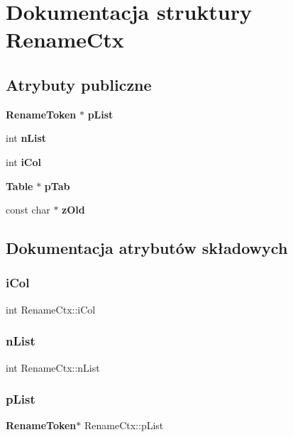 \section{Dokumentacja struktury Rename\+Ctx}
\label{struct_rename_ctx}
\subsection*{Atrybuty publiczne}
\begin{DoxyCompactItemize}
\item 
\textbf{ Rename\+Token} $\ast$ \textbf{ p\+List}
\item 
int \textbf{ n\+List}
\item 
int \textbf{ i\+Col}
\item 
\textbf{ Table} $\ast$ \textbf{ p\+Tab}
\item 
const char $\ast$ \textbf{ z\+Old}
\end{DoxyCompactItemize}


\subsection{Dokumentacja atrybutów składowych}
\mbox{\label{struct_rename_ctx_ad9a482d9cdc3ba175a9659eebcc20ee2}} 
\subsubsection{iCol}
{\footnotesize\ttfamily int Rename\+Ctx\+::i\+Col}

\mbox{\label{struct_rename_ctx_a1c164be49c03e4b5b4fb9fce482ad24b}} 
\subsubsection{nList}
{\footnotesize\ttfamily int Rename\+Ctx\+::n\+List}

\mbox{\label{struct_rename_ctx_a80b3613bb4c513ca112aaa8a50f13ab7}} 
\subsubsection{pList}
{\footnotesize\ttfamily \textbf{ Rename\+Token}$\ast$ Rename\+Ctx\+::p\+List}

\mbox{\label{struct_rename_ctx_ac754eae58e94c5c9c965620d83082bf0}} 
